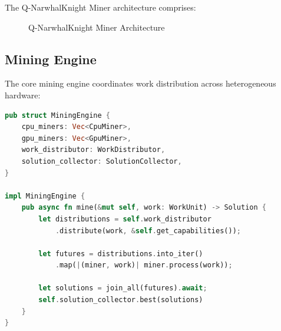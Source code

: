 \documentclass[11pt,a4paper]{article}
\begin{document}
The Q-NarwhalKnight Miner architecture comprises:

\begin{figure}[H]
\centering
{}
\caption{Q-NarwhalKnight Miner Architecture}
\end{figure}

\subsection{Mining Engine}

The core mining engine coordinates work distribution across heterogeneous hardware:

\begin{lstlisting}[language=Rust, caption=Mining Engine Core]
pub struct MiningEngine {
    cpu_miners: Vec<CpuMiner>,
    gpu_miners: Vec<GpuMiner>,
    work_distributor: WorkDistributor,
    solution_collector: SolutionCollector,
}

impl MiningEngine {
    pub async fn mine(&mut self, work: WorkUnit) -> Solution {
        let distributions = self.work_distributor
            .distribute(work, &self.get_capabilities());
        
        let futures = distributions.into_iter()
            .map(|(miner, work)| miner.process(work));
        
        let solutions = join_all(futures).await;
        self.solution_collector.best(solutions)
    }
}
\end{lstlisting}
\end{document}

